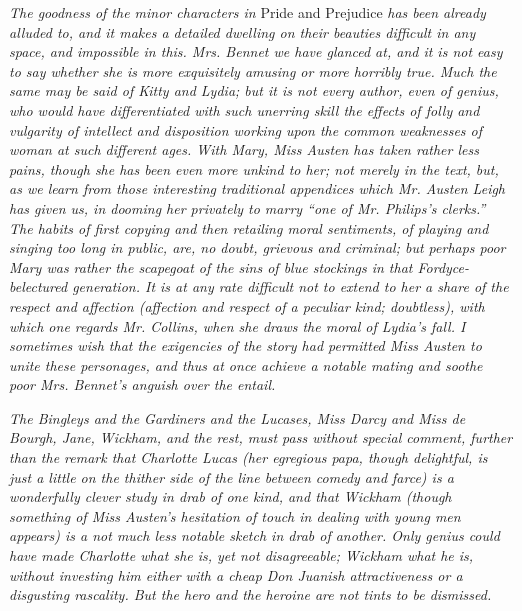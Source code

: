 \textit{The goodness of the minor characters in} Pride and Prejudice \textit{has been already alluded to, and it makes a detailed dwelling on their beauties difficult in any space, and impossible in this. Mrs. Bennet we have glanced at, and it is not easy to say whether she is more exquisitely amusing or more horribly true. Much the same may be said of Kitty and Lydia; but it is not every author, even of genius, who would have differentiated with such unerring skill the effects of folly and vulgarity of intellect and disposition working upon the common weaknesses of woman at such different ages. With Mary, Miss Austen has taken rather less pains, though she has been even more unkind to her; not merely in the text, but, as we learn from those interesting traditional appendices which Mr. Austen Leigh has given us, in dooming her privately to marry ``one of Mr. Philips's clerks.'' The habits of first copying and then retailing moral sentiments, of playing and singing too long in public, are, no doubt, grievous and criminal; but perhaps poor Mary was rather the scapegoat of the sins of blue stockings in that Fordyce-belectured generation. It is at any rate difficult not to extend to her a share of the respect and affection (affection and respect of a peculiar kind; doubtless), with which one regards Mr. Collins, when she draws the moral of Lydia's fall. I sometimes wish that the exigencies of the story had permitted Miss Austen to unite these personages, and thus at once achieve a notable mating and soothe poor Mrs. Bennet's anguish over the entail.}

\textit{The Bingleys and the Gardiners and the Lucases, Miss Darcy and Miss de Bourgh, Jane, Wickham, and the rest, must pass without special comment, further than the remark that Charlotte Lucas (her egregious papa, though delightful, is just a little on the thither side of the line between comedy and farce) is a wonderfully clever study in drab of one kind, and that Wickham (though something of Miss Austen's hesitation of touch in dealing with young men appears) is a not much less notable sketch in drab of another. Only genius could have made Charlotte what she is, yet not disagreeable; Wickham what he is, without investing him either with a cheap Don Juanish attractiveness or a disgusting rascality. But the hero and the heroine are not tints to be dismissed.}

